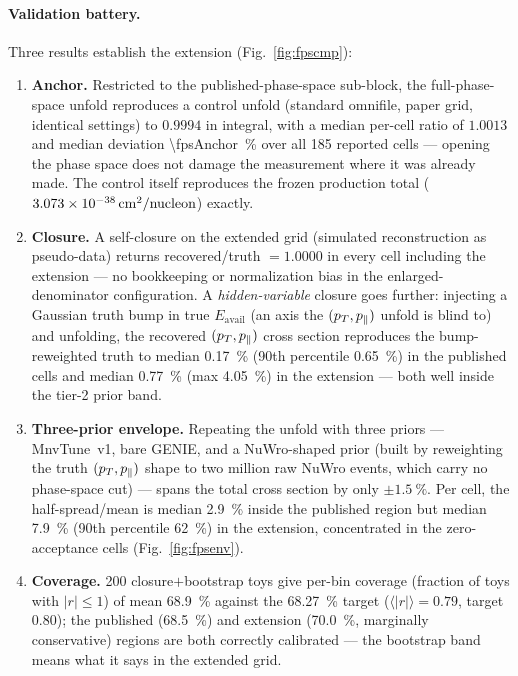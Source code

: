 \paragraph{Validation battery.}
Three results establish the extension (Fig.~\ref{fig:fpscmp}):
\begin{enumerate}[itemsep=2pt]
  \item \textbf{Anchor.} Restricted to the published-phase-space sub-block,
        the full-phase-space unfold reproduces a control unfold (standard
        omnifile, paper grid, identical settings) to $0.9994$ in integral,
        with a median per-cell ratio of $1.0013$ and median deviation
        \SI{\fpsAnchor}{\percent} over all 185 reported cells --- opening the
        phase space does not damage the measurement where it was already
        made. The control itself reproduces the frozen production total
        ($\SI{3.073e-38}{cm^2/nucleon}$) exactly.
  \item \textbf{Closure.} A self-closure on the extended grid (simulated
        reconstruction as pseudo-data) returns recovered/truth $=1.0000$ in
        every cell including the extension --- no bookkeeping or
        normalization bias in the enlarged-denominator configuration. A
        \emph{hidden-variable} closure goes further: injecting a Gaussian
        truth bump in true $E_{\mathrm{avail}}$ (an axis the
        $(p_{T},p_{\parallel})$ unfold is blind to) and unfolding, the recovered
        $(p_{T},p_{\parallel})$ cross section reproduces the bump-reweighted truth to
        median \SI{0.17}{\percent} (90th percentile \SI{0.65}{\percent}) in
        the published cells and median \SI{0.77}{\percent} (max
        \SI{4.05}{\percent}) in the extension --- both well inside the
        tier-2 prior band.
  \item \textbf{Three-prior envelope.} Repeating the unfold with three
        priors --- MnvTune~v1, bare GENIE, and a NuWro-shaped prior (built
        by reweighting the truth $(p_{T},p_{\parallel})$ shape to two million raw
        NuWro events, which carry no phase-space cut) --- spans the total
        cross section by only $\pm\SI{1.5}{\percent}$. Per cell, the
        half-spread/mean is median \SI{2.9}{\percent} inside the published
        region but median \SI{7.9}{\percent} (90th percentile
        \SI{62}{\percent}) in the extension, concentrated in the
        zero-acceptance cells (Fig.~\ref{fig:fpsenv}).
  \item \textbf{Coverage.} 200 closure$+$bootstrap toys give per-bin
        coverage (fraction of toys with $|r|\le1$) of mean
        \SI{68.9}{\percent} against the \SI{68.27}{\percent} target
        ($\langle|r|\rangle=0.79$, target $0.80$); the published
        (\SI{68.5}{\percent}) and extension (\SI{70.0}{\percent}, marginally
        conservative) regions are both correctly calibrated --- the bootstrap
        band means what it says in the extended grid.
\end{enumerate}

